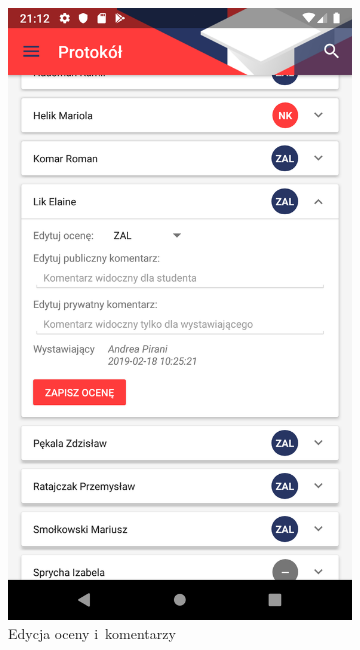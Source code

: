 \documentclass{pracamgr}
\begin{document}
\begin{figure}[p]
\begin{subfigure}[t]{0.3\textwidth}
		\includegraphics[width=\textwidth]{img/protocols_edit.png}
		\caption{Edycja oceny i~komentarzy}
		\label{fig:protocols_edit}
	\end{subfigure}
	\quad
	\begin{subfigure}[t]{0.3\textwidth}

\end{subfigure}
\end{figure}
\end{document}
